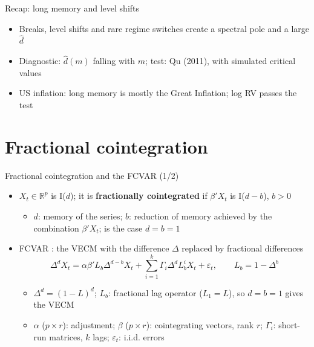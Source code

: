\begin{frame}{Recap: long memory and level shifts}
\itemsize{\small}
\begin{itemize}
    \item Breaks, level shifts and rare regime switches create a spectral pole and a large $\hat d$
    \item Diagnostic: $\hat d(m)$ falling with $m$; test: Qu (2011), with simulated critical values
    \item US inflation: long memory is mostly the Great Inflation; log RV passes the test
\end{itemize}
\end{frame}


\section{Fractional cointegration}

\begin{frame}{Fractional cointegration and the FCVAR (1/2)}
\itemsize{\small}
\begin{itemize}
    \item $X_t \in \mathbb R^p$ is I($d$); it is \textbf{fractionally cointegrated} if $\beta'X_t$ is I($d - b$), $b > 0$
    \begin{itemize}
        \item $d$: memory of the series; $b$: reduction of memory achieved by the combination $\beta'X_t$;  is the case $d = b = 1$
    \end{itemize}
    \item FCVAR : the VECM with the difference $\Delta$ replaced by fractional differences
    \[ \Delta^dX_t = \alpha\beta'L_b\Delta^{d-b}X_t + \sum_{i=1}^k\Gamma_i\Delta^dL_b^iX_t + \varepsilon_t, \qquad L_b = 1 - \Delta^b \]
    \begin{itemize}
        \item $\Delta^d = (1 - L)^d$; $L_b$: fractional lag operator ($L_1 = L$), so $d = b = 1$ gives the VECM
        \item $\alpha$ ($p \times r$): adjustment; $\beta$ ($p \times r$): cointegrating vectors, rank $r$; $\Gamma_i$: short-run matrices, $k$ lags; $\varepsilon_t$: i.i.d. errors
    \end{itemize}
\end{itemize}
\end{frame}

